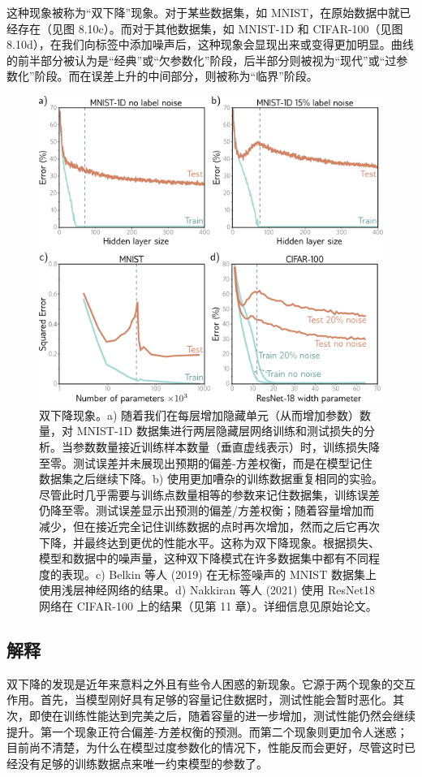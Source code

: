 这种现象被称为“双下降”现象。对于某些数据集，如 MNIST，在原始数据中就已经存在（见图 8.10c）。而对于其他数据集，如 MNIST-1D 和 CIFAR-100（见图 8.10d），在我们向标签中添加噪声后，这种现象会显现出来或变得更加明显。曲线的前半部分被认为是“经典”或“欠参数化”阶段，后半部分则被视为“现代”或“过参数化”阶段。而在误差上升的中间部分，则被称为“临界”阶段。

\begin{figure}[ht!]
\centering
\includegraphics[width=0.7\linewidth]{png/chapter8/PerfDoubleDescent.png}
\caption{双下降现象。a) 随着我们在每层增加隐藏单元（从而增加参数）数量，对 MNIST-1D 数据集进行两层隐藏层网络训练和测试损失的分析。当参数数量接近训练样本数量（垂直虚线表示）时，训练损失降至零。测试误差并未展现出预期的偏差-方差权衡，而是在模型记住数据集之后继续下降。b) 使用更加嘈杂的训练数据重复相同的实验。尽管此时几乎需要与训练点数量相等的参数来记住数据集，训练误差仍降至零。测试误差显示出预测的偏差/方差权衡；随着容量增加而减少，但在接近完全记住训练数据的点时再次增加，然而之后它再次下降，并最终达到更优的性能水平。这称为双下降现象。根据损失、模型和数据中的噪声量，这种双下降模式在许多数据集中都有不同程度的表现。c) Belkin 等人 (2019) 在无标签噪声的 MNIST 数据集上使用浅层神经网络的结果。d) Nakkiran 等人 (2021) 使用 ResNet18 网络在 CIFAR-100 上的结果（见第 11 章）。详细信息见原始论文。}
\end{figure}

\subsection{解释}
双下降的发现是近年来意料之外且有些令人困惑的新现象。它源于两个现象的交互作用。首先，当模型刚好具有足够的容量记住数据时，测试性能会暂时恶化。其次，即使在训练性能达到完美之后，随着容量的进一步增加，测试性能仍然会继续提升。第一个现象正符合偏差-方差权衡的预测。而第二个现象则更加令人迷惑；目前尚不清楚，为什么在模型过度参数化的情况下，性能反而会更好，尽管这时已经没有足够的训练数据点来唯一约束模型的参数了。

